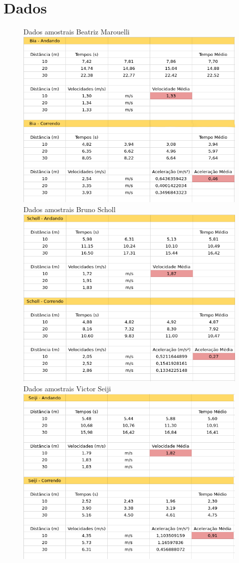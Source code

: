 \documentclass[a4paper, 12pt]{article}
\begin{document}
\section*{Dados}
    \begin{figure}
    \centering
    Dados amostrais Beatriz Marouelli
    \includegraphics[scale=0.45]{Bia.png}
    \\ Dados amostrais Bruno Scholl
    \includegraphics[scale=0.45]{Scholl.png}
    \\ Dados amostrais Victor Seiji 
    \includegraphics[scale=0.45]{Seiji.png}
    \end{figure}
\end{document}
